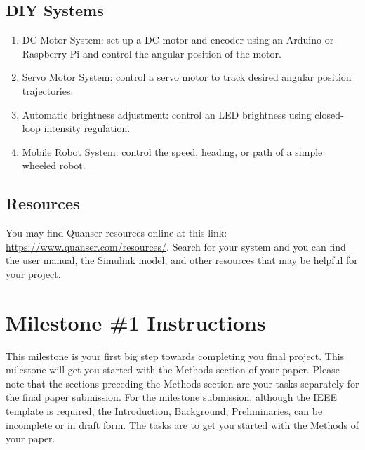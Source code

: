 \documentclass{ee122_notes}
\begin{document}
\subsection*{DIY Systems}

\begin{enumerate}
    \item DC Motor System: set up a DC motor and encoder using an Arduino or Raspberry Pi and control the angular position of the motor.

    \item Servo Motor System: control a servo motor to track desired angular position trajectories.

    \item Automatic brightness adjustment: control an LED brightness using closed-loop intensity regulation.

    \item Mobile Robot System: control the speed, heading, or path of a simple wheeled robot.
    
\end{enumerate}
\subsection{Resources}
You may find Quanser resources online at this link: \url{https://www.quanser.com/resources/}. Search for your system and you can find the user manual, the Simulink model, and other resources that may be helpful for your project.
\section{Milestone \#1 Instructions}
This milestone is your first big step towards completing you final project. This milestone will get you started with the Methods section of your paper. Please note that the sections preceding the Methods section are your tasks separately for the final paper submission. For the milestone submission, although the IEEE template is required, the Introduction, Background, Preliminaries, can be incomplete or in draft form. The tasks are to get you started with the Methods of your paper.
\end{document}
